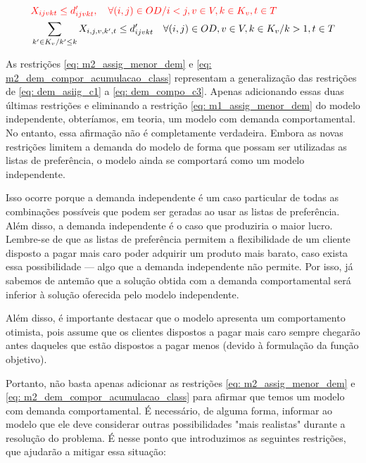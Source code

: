 \allowdisplaybreaks
\begin{align}
	& \textcolor{red}{X_{ijvkt} \leq d'_{ijvkt},  \quad \forall (i,j) \in OD / i < j  ,v \in V, k \in K_v, t\in T }                                                                                                 \label{eq: m2_assig_menor_dem}                                                 \\
	& \sum_{k' \in K_v / k' \leq k}X_{i,j,v,k',t} \leq d'_{ijvkt} \quad \forall (i,j) \in OD, v \in V, k \in K_v / k > 1, t\in T                                                                                    \label{eq: m2_dem_compor_acumulacao_class}                                     
\end{align}

As restrições \ref{eq: m2_assig_menor_dem} e \ref{eq: m2_dem_compor_acumulacao_class} representam a generalização das restrições de \ref{eq: dem_asiig_c1} a \ref{eq: dem_compo_c3}. Apenas adicionando essas duas últimas restrições e eliminando a restrição \ref{eq: m1_assig_menor_dem} do modelo independente, obteríamos, em teoria, um modelo com demanda comportamental. No entanto, essa afirmação não é completamente verdadeira. Embora as novas restrições limitem a demanda do modelo de forma que possam ser utilizadas as listas de preferência, o modelo ainda se comportará como um modelo independente.

Isso ocorre porque a demanda independente é um caso particular de todas as combinações possíveis que podem ser geradas ao usar as listas de preferência. Além disso, a demanda independente é o caso que produziria o maior lucro. Lembre-se de que as listas de preferência permitem a flexibilidade de um cliente disposto a pagar mais caro poder adquirir um produto mais barato, caso exista essa possibilidade — algo que a demanda independente não permite. Por isso, já sabemos de antemão que a solução obtida com a demanda comportamental será inferior à solução oferecida pelo modelo independente.

Além disso, é importante destacar que o modelo apresenta um comportamento otimista, pois assume que os clientes dispostos a pagar mais caro sempre chegarão antes daqueles que estão dispostos a pagar menos (devido à formulação da função objetivo).

Portanto, não basta apenas adicionar as restrições \ref{eq: m2_assig_menor_dem} e \ref{eq: m2_dem_compor_acumulacao_class} para afirmar que temos um modelo com demanda comportamental. É necessário, de alguma forma, informar ao modelo que ele deve considerar outras possibilidades "mais realistas" durante a resolução do problema. É nesse ponto que introduzimos as seguintes restrições, que ajudarão a mitigar essa situação:

